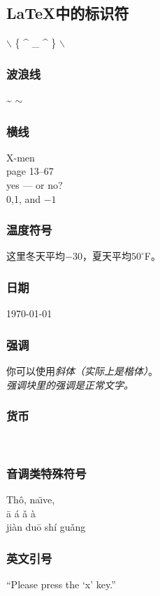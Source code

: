 \documentclass[12pt]{article}
\begin{document}
\subsection{\LaTeX 中的标识符}
$\backslash$ \{ \^{} \_{} \^{} \} $\backslash$

\subsubsection{波浪线}
\~{} \qquad $\sim$  %

\subsubsection{横线}
X-men \\
page 13--67\\
yes --- or no?\\
0,1, and $-1$

\subsubsection{温度符号}
这里冬天平均$-30$\textcelsius ，夏天平均$50^{\circ}$F。

\subsubsection{日期}
\today

\subsubsection{强调}
你可以使用\textsl{斜体（实际上是楷体）}。\\
\emph{强调块里的强调是\emph{正常}文字。}

\subsubsection{货币}
\texteuro \  \textdollar

\subsubsection{音调类特殊符号}
Th\^o, na\"\i ve,\\
\= a \' a \v a \` a \\
ji\` an du\= o sh\' i gu\v ang

\subsubsection{英文引号}
``Please press the `x' key.''
\end{document}
